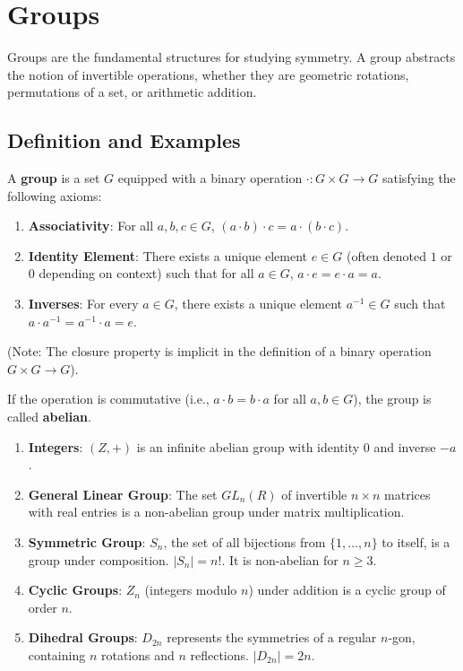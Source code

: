 \documentclass[oneside]{book}
\begin{document}
\section{Groups}

Groups are the fundamental structures for studying symmetry. A group abstracts the notion of invertible operations, whether they are geometric rotations, permutations of a set, or arithmetic addition.

\subsection{Definition and Examples}

\begin{definition}[Group]
A \textbf{group} is a set $G$ equipped with a binary operation $\cdot: G \times G \to G$ satisfying the following axioms:
\begin{enumerate}
    \item \textbf{Associativity}: For all $a, b, c \in G$, $(a \cdot b) \cdot c = a \cdot (b \cdot c)$.
    \item \textbf{Identity Element}: There exists a unique element $e \in G$ (often denoted $1$ or $0$ depending on context) such that for all $a \in G$, $a \cdot e = e \cdot a = a$.
    \item \textbf{Inverses}: For every $a \in G$, there exists a unique element $a^{-1} \in G$ such that $a \cdot a^{-1} = a^{-1} \cdot a = e$.
\end{enumerate}
(Note: The closure property is implicit in the definition of a binary operation $G \times G \to G$).
\end{definition}

\begin{definition}
If the operation is commutative (i.e., $a \cdot b = b \cdot a$ for all $a, b \in G$), the group is called \textbf{abelian}.
\end{definition}

\newpage

\begin{example}
\begin{enumerate}
    \item \textbf{Integers}: $(Z, +)$ is an infinite abelian group with identity $0$ and inverse $-a$.
    \item \textbf{General Linear Group}: The set $GL_n(R)$ of invertible $n \times n$ matrices with real entries is a non-abelian group under matrix multiplication.
    \item \textbf{Symmetric Group}: $S_n$, the set of all bijections from $\{1, \dots, n\}$ to itself, is a group under composition. $|S_n| = n!$. It is non-abelian for $n \geq 3$.
    \item \textbf{Cyclic Groups}: $Z_n$ (integers modulo $n$) under addition is a cyclic group of order $n$.
    \item \textbf{Dihedral Groups}: $D_{2n}$ represents the symmetries of a regular $n$-gon, containing $n$ rotations and $n$ reflections. $|D_{2n}| = 2n$.
\end{enumerate}
\end{example}
\end{document}
